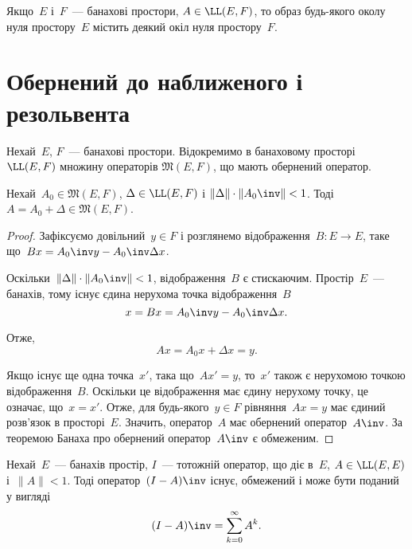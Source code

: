 \begin{corollary}
Якщо~$E$ і~$F$~--- банахові простори,
$A \in \LL(E, F)$, то образ будь-якого околу нуля простору~$E$
містить деякий окіл нуля простору~$F$.
\end{corollary}

\section{Обернений до наближеного і резольвента}

Нехай~$E$, $F$~--- банахові простори. Відокремимо в
банаховому просторі~$\LL(E, F)$ множину операторів
$\mathfrak{M}(E, F)$, що мають обернений оператор.

\begin{theorem}
Нехай~$A_0 \in \mathfrak{M}(E, F)$, $\Delta \in \LL(E, F)$ і
$\|\Delta\| \cdot \|A_0\inv\| < 1$.
Тоді~$A = A_0 + \Delta \in \mathfrak{M}(E, F)$.
\end{theorem}

\begin{proof}
Зафіксуємо довільний~$y \in F$ і розглянемо
відображення~$B: E \to E$, таке що~$B x = A_0\inv y - A_0\inv \Delta x$.

Оскільки~$\|\Delta\| \cdot \|A_0\inv\| < 1$, відображення~$B$ є стискаючим.
Простір~$E$~--- банахів, тому існує єдина нерухома точка відображення~$B$
\begin{equation*}
    x = B x = A_0\inv y - A_0\inv \Delta x.
\end{equation*}

Отже,
\begin{equation*}
    A x = A_0 x + \Delta x = y.
\end{equation*}

Якщо існує ще одна точка~$x'$, така що~$A x' = y$,
то~$x'$ також є нерухомою точкою відображення~$B$.
Оскільки це відображення має єдину нерухому точку,
це означає, що~$x = x'$.
Отже, для будь-якого~$y \in F$ рівняння~$A x = y$
має єдиний розв’язок в просторі~$E$.
Значить, оператор~$A$ має обернений оператор~$A\inv$.
За теоремою Банаха про обернений оператор~$A\inv$ є обмеженим. 
\end{proof}

\begin{theorem}
Нехай~$E$~--- банахів простір,
$I$~--- тотожній оператор, що діє в~$E$,
$A \in \LL(E, E)$ і~$\|A\| < 1$.
Тоді оператор~$(I - A)\inv$ існує, обмежений
і може бути поданий у вигляді
\begin{equation*}
    (I - A)\inv = \sum_{k = 0}^\infty A^k.
\end{equation*}
\end{theorem}


